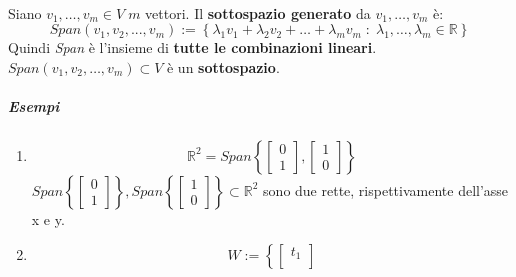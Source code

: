 \documentclass[a4paper, 12pt]{report}
\begin{document}
            \paragraph{}Siano $v_1,\dots,v_m \in V \;m$ vettori. Il \textbf{sottospazio generato} da $v_1,\dots,v_m$ è:
            $$
                Span(v_1,v_2,...,v_m):= \left \{\lambda_1v_1+\lambda_2v_2+\dots+\lambda_mv_m\;:\;\lambda_1,\dots,\lambda_m \in \mathbb{R}\right\}
            $$   
            Quindi \textit{Span} è l'insieme di \textbf{tutte le combinazioni lineari}.\\
            $Span(v_1,v_2,\dots,v_m) \subset V$ è un \textbf{sottospazio}.     
                \subparagraph{Esempi}
                \begin{enumerate}
                    \item 
                        $$
                        \mathbb{R}^2 = Span \left\{
                            \begin{bmatrix}
                                0\\
                                1
                            \end{bmatrix}
                            ,
                            \begin{bmatrix}
                                1\\
                                0
                            \end{bmatrix}
                            \right\}
                        $$ 
                        $
                        Span \left\{
                        \begin{bmatrix}
                            0\\
                            1
                        \end{bmatrix}
                        \right\},Span
                        \left\{
                        \begin{bmatrix}
                            1\\
                            0
                        \end{bmatrix}
                        \right\} \subset \mathbb{R}^2
                        $    
                        sono due rette, rispettivamente dell'asse x e y.
                    \item 
                        $$
                        W := \left\{
                            \begin{bmatrix}
                                t_1\\

\end{bmatrix}$$
\end{enumerate}
\end{document}
